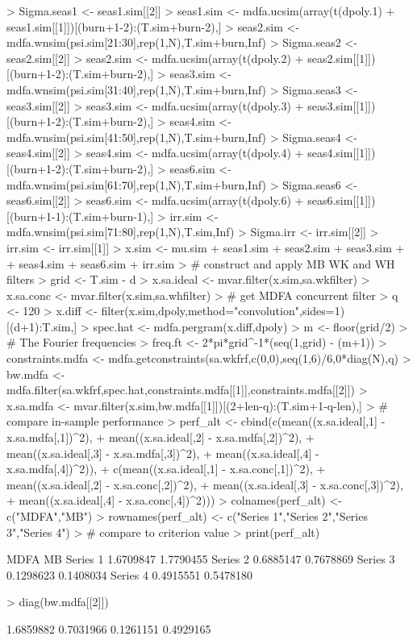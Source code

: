 \documentclass[a4paper]{book}
\begin{document}
\begin{Schunk}
\begin{Sinput}
> Sigma.seas1 <- seas1.sim[[2]]
> seas1.sim <- mdfa.ucsim(array(t(dpoly.1) %
+                      seas1.sim[[1]])[(burn+1-2):(T.sim+burn-2),]
> seas2.sim <- mdfa.wnsim(psi.sim[21:30],rep(1,N),T.sim+burn,Inf)
> Sigma.seas2 <- seas2.sim[[2]]
> seas2.sim <- mdfa.ucsim(array(t(dpoly.2) %
+                      seas2.sim[[1]])[(burn+1-2):(T.sim+burn-2),]
> seas3.sim <- mdfa.wnsim(psi.sim[31:40],rep(1,N),T.sim+burn,Inf)
> Sigma.seas3 <- seas3.sim[[2]]
> seas3.sim <- mdfa.ucsim(array(t(dpoly.3) %
+                      seas3.sim[[1]])[(burn+1-2):(T.sim+burn-2),]
> seas4.sim <- mdfa.wnsim(psi.sim[41:50],rep(1,N),T.sim+burn,Inf)
> Sigma.seas4 <- seas4.sim[[2]]
> seas4.sim <- mdfa.ucsim(array(t(dpoly.4) %
+                      seas4.sim[[1]])[(burn+1-2):(T.sim+burn-2),]
> seas6.sim <- mdfa.wnsim(psi.sim[61:70],rep(1,N),T.sim+burn,Inf)
> Sigma.seas6 <- seas6.sim[[2]]
> seas6.sim <- mdfa.ucsim(array(t(dpoly.6) %
+                      seas6.sim[[1]])[(burn+1-1):(T.sim+burn-1),]
> irr.sim <- mdfa.wnsim(psi.sim[71:80],rep(1,N),T.sim,Inf)
> Sigma.irr <- irr.sim[[2]]
> irr.sim <- irr.sim[[1]] 
> x.sim <- mu.sim + seas1.sim + seas2.sim + seas3.sim +
+   seas4.sim + seas6.sim + irr.sim
> # construct and apply MB WK and WH filters
> grid <- T.sim - d
> x.sa.ideal <- mvar.filter(x.sim,sa.wkfilter)
> x.sa.conc <- mvar.filter(x.sim,sa.whfilter)
> # get MDFA concurrent filter
> q <- 120
> x.diff <- filter(x.sim,dpoly,method="convolution",sides=1)[(d+1):T.sim,]
> spec.hat <- mdfa.pergram(x.diff,dpoly)
> m <- floor(grid/2)
> # The Fourier frequencies
> freq.ft <- 2*pi*grid^{-1}*(seq(1,grid) - (m+1))
> constraints.mdfa <- mdfa.getconstraints(sa.wkfrf,c(0,0),seq(1,6)/6,0*diag(N),q)
> bw.mdfa <- mdfa.filter(sa.wkfrf,spec.hat,constraints.mdfa[[1]],constraints.mdfa[[2]])
> x.sa.mdfa <- mvar.filter(x.sim,bw.mdfa[[1]])[(2+len-q):(T.sim+1-q-len),]
> # compare in-sample performance
> perf_alt <- cbind(c(mean((x.sa.ideal[,1] - x.sa.mdfa[,1])^2),
+ 	mean((x.sa.ideal[,2] - x.sa.mdfa[,2])^2),
+ 	mean((x.sa.ideal[,3] - x.sa.mdfa[,3])^2),
+ 	mean((x.sa.ideal[,4] - x.sa.mdfa[,4])^2)),
+   c(mean((x.sa.ideal[,1] - x.sa.conc[,1])^2),
+ 	mean((x.sa.ideal[,2] - x.sa.conc[,2])^2),
+ 	mean((x.sa.ideal[,3] - x.sa.conc[,3])^2),
+ 	mean((x.sa.ideal[,4] - x.sa.conc[,4])^2)))
> colnames(perf_alt) <- c("MDFA","MB")
> rownames(perf_alt) <- c("Series 1","Series 2","Series 3","Series 4")
> # compare to criterion value
> print(perf_alt)
\end{Sinput}
\begin{Soutput}
              MDFA        MB
Series 1 1.6709847 1.7790455
Series 2 0.6885147 0.7678869
Series 3 0.1298623 0.1408034
Series 4 0.4915551 0.5478180
\end{Soutput}
\begin{Sinput}
> diag(bw.mdfa[[2]])
\end{Sinput}
\begin{Soutput}
[1] 1.6859882 0.7031966 0.1261151 0.4929165
\end{Soutput}
\end{Schunk}
\end{document}
